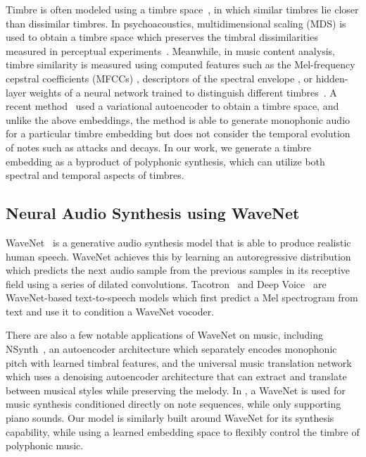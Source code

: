Timbre is often modeled using a timbre space~\cite{peeters2011timbre}, in which similar timbres lie closer than dissimilar timbres.
In psychoacoustics, multidimensional scaling (MDS) is used to obtain a timbre space which preserves the timbral dissimilarities measured in perceptual experiments~\cite{grey1977multidimensional,wessel1979timbre}.
Meanwhile, in music content analysis, timbre similarity is measured using computed features such as the Mel-frequency cepstral coefficients (MFCCs) \cite{logan2000mfcc},
descriptors of the spectral envelope \cite{agostini2013aid}, or hidden-layer weights of a neural network trained to distinguish different timbres~\cite{humphrey2011nlse}.
A recent method~\cite{esling2018timbre} used a variational autoencoder \cite{kingma2014vae} to obtain a timbre space, and unlike the above embeddings, the method is able to generate monophonic audio for a particular timbre embedding but does not consider the temporal evolution of notes such as attacks and decays.
In our work, we generate a timbre embedding as a byproduct of polyphonic synthesis, which can utilize both spectral and temporal aspects of timbres.


\subsection{Neural Audio Synthesis using WaveNet}

WaveNet~\cite{oord2016wavenet} is a generative audio synthesis model that is able to produce realistic human speech.
WaveNet achieves this by learning an autoregressive distribution which predicts the next audio sample from the previous samples in its receptive field using a series of dilated convolutions.
Tacotron~\cite{shen2018tacotron} and Deep Voice~\cite{ping2018deepvoice3} are WaveNet-based text-to-speech models which first predict a Mel spectrogram from text and use it to condition a WaveNet vocoder.

There are also a few notable applications of WaveNet on music, including NSynth~\cite{engel2017nsynth}, an autoencoder architecture which separately encodes monophonic pitch with learned timbral features, and the universal music translation network~\cite{mor2019universal} which uses a denoising autoencoder architecture that can extract and translate between musical styles while preserving the melody.
In \cite{hawthorne2019maestro}, a WaveNet is used for music synthesis conditioned directly on note sequences, while only supporting piano sounds.
Our model is similarly built around WaveNet for its synthesis capability, while using a learned embedding space to flexibly control the timbre of polyphonic music.


